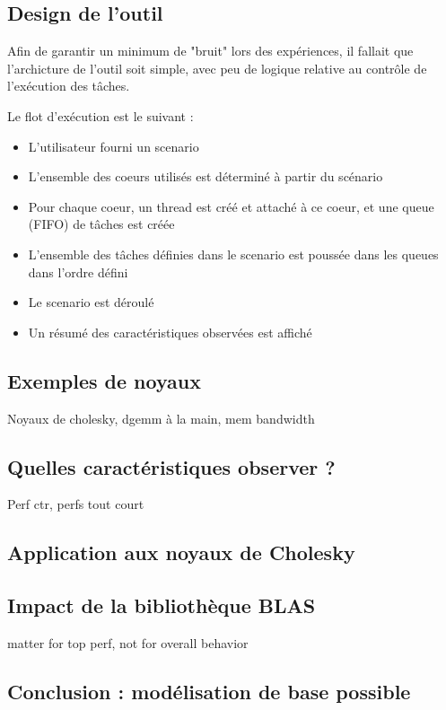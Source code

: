\subsection{Design de l'outil}

Afin de garantir un minimum de "bruit" lors des expériences, il fallait que l'archicture de l'outil soit simple, avec peu de logique relative au contrôle de l'exécution des tâches.

Le flot d'exécution est le suivant :
\begin{itemize}
 \item L'utilisateur fourni un scenario
 \item L'ensemble des coeurs utilisés est déterminé à partir du scénario
 \item Pour chaque coeur, un thread est créé et attaché à ce coeur, et une queue (FIFO) de tâches est créée
 \item L'ensemble des tâches définies dans le scenario est poussée dans les queues dans l'ordre défini
 \item Le scenario est déroulé
 \item Un résumé des caractéristiques observées est affiché
\end{itemize}

\subsection{Exemples de noyaux}

Noyaux de cholesky, dgemm à la main, mem bandwidth

\subsection{Quelles caractéristiques observer ?}
Perf ctr, perfs tout court

\subsection{Application aux noyaux de Cholesky}
\subsection{Impact de la bibliothèque BLAS}

matter for top perf, not for overall behavior

\subsection{Conclusion : modélisation de base possible}

